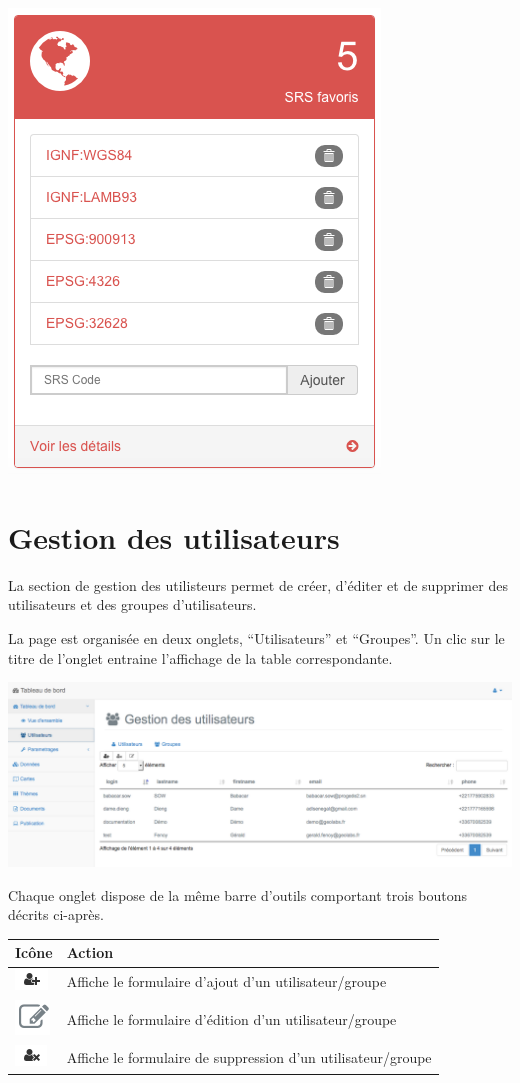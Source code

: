 \documentclass[letterpaper,10pt,french]{sphinxmanual}
\begin{document}
\includegraphics[width=0.330\linewidth]{dashboard-srs-block.png}


\section{Gestion des utilisateurs}
\label{dashboard/usersmanagement:gestion-des-utilisateurs}\label{dashboard/usersmanagement::doc}\label{dashboard/usersmanagement:dashboard-usersmanagement}
La section de gestion des utilisteurs permet de créer, d'éditer et de
supprimer des utilisateurs et des groupes d'utilisateurs.

La page est organisée en deux onglets, ``Utilisateurs'' et ``Groupes''. Un
clic sur le titre de l'onglet entraine l'affichage de la table correspondante.

\includegraphics[width=1.000\linewidth]{manage-users-preview.png}

Chaque onglet dispose de la même barre d'outils comportant trois boutons décrits ci-après.

\begin{tabulary}{\linewidth}{|L|L|}
\hline

\textbf{Icône}
 & 
\textbf{Action}
\\
\hline
\includegraphics{add-user.png}
 & 
Affiche le formulaire d'ajout d'un utilisateur/groupe
\\
\hline
\includegraphics{pencil.png}
 & 
Affiche le formulaire d'édition d'un utilisateur/groupe
\\
\hline
\includegraphics{delete-user.png}
 & 
Affiche le formulaire de suppression d'un utilisateur/groupe
\\
\hline\end{tabulary}
\end{document}
